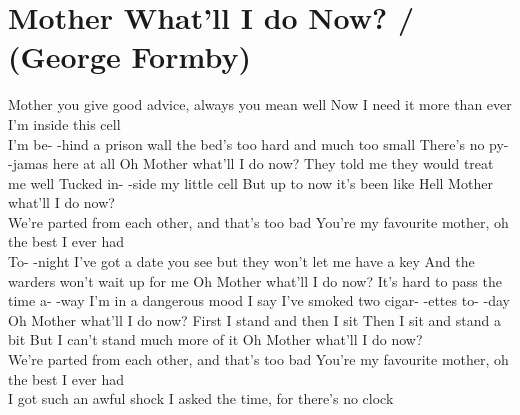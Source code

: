 \section{Mother What'll I do Now? / (George Formby)}\label{sec:mother_what_ll_i_do_now_}
Mother you give good advice, always you mean well
Now I need it more than ever I'm inside
this cell
\\
I'm be- -hind a prison wall
the bed's too hard and much too small
There's no py- -jamas here at all
Oh Mother what'll I do now?
They told me they would treat me well
Tucked in- -side my little cell
But up to now it's been like Hell
Mother what'll I do now?
\\
We're parted from each other, and that's too bad
You're my favourite mother, oh the best I ever had
\\
To- -night I've got a date you see
but they won't let me have a key
And the warders won't wait up for me
Oh Mother what'll I do now?
It's hard to pass the time a- -way
I'm in a dangerous mood I say
I've smoked two cigar- -ettes to- -day
Oh Mother what'll I do now?
First I stand and then I sit
Then I sit and stand a bit
But I can't stand much more of it
Oh Mother what'll I do now?
\\
We're parted from each other, and that's too bad
You're my favourite mother, oh the best I ever had
\\
I got such an awful shock
I asked the time, for there's no clock
